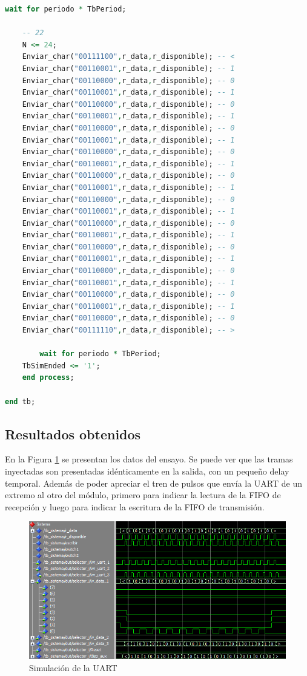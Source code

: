 \begin{lstlisting}[language = vhdl,caption=Testbench del módulo UART,label={lst:test_uart}]
	wait for periodo * TbPeriod;

	-- 22
	N <= 24; 	
	Enviar_char("00111100",r_data,r_disponible); -- < 	
	Enviar_char("00110001",r_data,r_disponible); -- 1 	
	Enviar_char("00110000",r_data,r_disponible); -- 0
 	Enviar_char("00110001",r_data,r_disponible); -- 1 	
	Enviar_char("00110000",r_data,r_disponible); -- 0
	Enviar_char("00110001",r_data,r_disponible); -- 1 	
	Enviar_char("00110000",r_data,r_disponible); -- 0
	Enviar_char("00110001",r_data,r_disponible); -- 1 	
	Enviar_char("00110000",r_data,r_disponible); -- 0
	Enviar_char("00110001",r_data,r_disponible); -- 1 	
	Enviar_char("00110000",r_data,r_disponible); -- 0
	Enviar_char("00110001",r_data,r_disponible); -- 1 	
	Enviar_char("00110000",r_data,r_disponible); -- 0
	Enviar_char("00110001",r_data,r_disponible); -- 1 	
	Enviar_char("00110000",r_data,r_disponible); -- 0
	Enviar_char("00110001",r_data,r_disponible); -- 1 	
	Enviar_char("00110000",r_data,r_disponible); -- 0
	Enviar_char("00110001",r_data,r_disponible); -- 1 	
	Enviar_char("00110000",r_data,r_disponible); -- 0
	Enviar_char("00110001",r_data,r_disponible); -- 1 	
	Enviar_char("00110000",r_data,r_disponible); -- 0
	Enviar_char("00110001",r_data,r_disponible); -- 1 
	Enviar_char("00110000",r_data,r_disponible); -- 0	
	Enviar_char("00111110",r_data,r_disponible); -- >
	
        wait for periodo * TbPeriod;
	TbSimEnded <= '1';
    end process;
	
end tb;

		\end{lstlisting}
			
	\subsection{Resultados obtenidos}
				
		En la Figura \ref{fig:Test_UART} se presentan los datos del ensayo. Se puede ver que las tramas inyectadas son presentadas idénticamente en la salida, con un pequeño delay temporal. Además de poder apreciar el tren de pulsos que envía la UART de un extremo al otro del módulo, primero para indicar la lectura de la FIFO de recepción y luego para indicar la escritura de la FIFO de transmisión.
		
		\begin{figure}[h]
		\centering
		\includegraphics[scale=0.7]{./Figures/Test/UART}
			\caption{Simulación de la UART}
			\label{fig:Test_UART}
		\end{figure}
			
